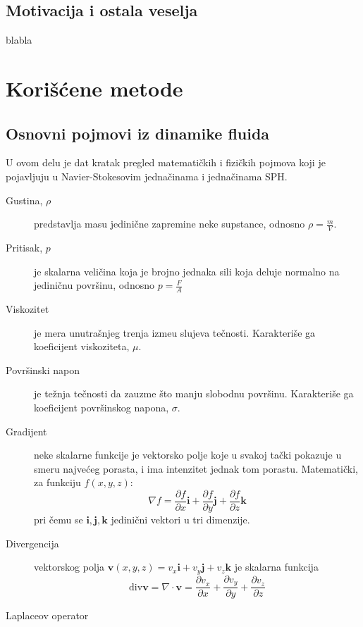 \documentclass[12pt]{article}
\renewcommand{\vec}[1]{\boldsymbol{#1}}
\begin{document}
    \subsection{Motivacija i ostala veselja}\label{motivacija}
        blabla

\section{Kori\v s\'cene metode}
    \subsection{Osnovni pojmovi iz dinamike fluida}
        U ovom delu je dat kratak pregled matemati\v ckih i fizi\v ckih pojmova koji je pojavljuju u Navier-Stokesovim jedna\v cinama i jedna\v cinama SPH.
        \label{definicije}
        \begin{description}
          \item[Gustina, $\rho$] predstavlja masu jedini\v cne zapremine neke supstance, odnosno $\rho = \frac{m}{V}$.
          \item[Pritisak, $p$] je skalarna veli\v cina koja je brojno jednaka sili koja deluje normalno na jedini\v cnu povr\v sinu, odnosno $p = \frac{F}{A}$
          \item[Viskozitet] je mera unutra\v snjeg trenja izme\dj u slujeva te\v cnosti. Karakteri\v se ga koeficijent viskoziteta, $\mu$.
          \item[Povr\v sinski napon] je te\v znja te\v cnosti da zauzme \v sto manju slobodnu povr\v sinu. Karakteri\v se ga koeficijent povr\v sinskog napona, $\sigma$.
          \item[Gradijent] neke skalarne funkcije je vektorsko polje koje u svakoj ta\v cki pokazuje u smeru najve\'ceg porasta, i ima intenzitet jednak tom porastu. Matemati\v cki, za funkciju $f(x, y, z)$:
                $$\nabla f=\frac{\partial f}{\partial x}\vec{i} + \frac{\partial f}{\partial y}\vec{j} + \frac{\partial f}{\partial z}\vec{k}$$ pri \v cemu se $\vec{i}, \vec{j}, \vec{k}$ jedini\v cni vektori u tri dimenzije.
          \item[Divergencija] vektorskog polja $\vec{v}(x, y, z)=v_x\vec{i}+v_y\vec{j}+v_z\vec{k}$ je skalarna funkcija
                $$\text{div} \vec{v} = \nabla \cdot \vec{v} = \frac{\partial v_x}{\partial x} + \frac{\partial v_y}{\partial y} + \frac{\partial v_z}{\partial z}$$
          \item[Laplaceov operator]
        \end{description}
\end{document}
